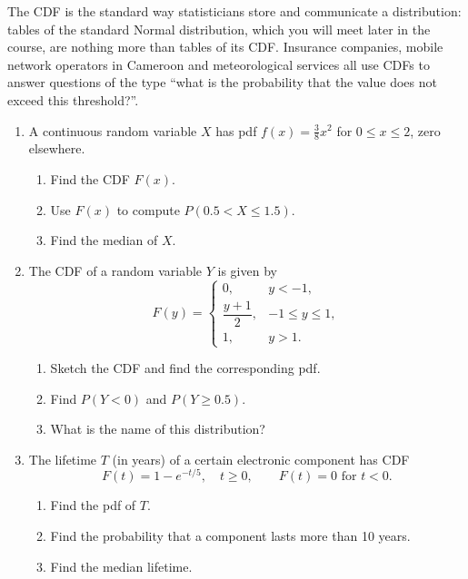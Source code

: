 \documentclass[11pt]{article}
\newcounter{popsec}
\newcounter{popsub}
\newcommand{\courssub}[1]{%
  \stepcounter{popsub}%
  \par\vspace{9pt}\noindent{\popxbold\fontsize{11.5}{13}\selectfont\color{popink}{\color{poporange}\thepopsec.\thepopsub}\hspace{6pt}#1}\par\nopagebreak\vspace{4pt}
}
\begin{document}
\begin{savaistu}
The CDF is the standard way statisticians store and communicate a distribution: tables of the standard Normal distribution, which you will meet later in the course, are nothing more than tables of its CDF. Insurance companies, mobile network operators in Cameroon and meteorological services all use CDFs to answer questions of the type ``what is the probability that the value does not exceed this threshold?''.
\end{savaistu}

\courssub{Exercises}

\begin{exercice}[Practice]
\begin{enumerate}
\item A continuous random variable $X$ has pdf $f(x) = \frac{3}{8}x^2$ for $0 \le x \le 2$, zero elsewhere.
\begin{enumerate}
\item Find the CDF $F(x)$.
\item Use $F(x)$ to compute $P(0.5 < X \le 1.5)$.
\item Find the median of $X$.
\end{enumerate}

\item The CDF of a random variable $Y$ is given by
\[
F(y) =
\begin{cases}
0, & y < -1,\\[4pt]
\dfrac{y+1}{2}, & -1 \le y \le 1,\\[8pt]
1, & y > 1.
\end{cases}
\]
\begin{enumerate}
\item Sketch the CDF and find the corresponding pdf.
\item Find $P(Y < 0)$ and $P(Y \ge 0.5)$.
\item What is the name of this distribution?
\end{enumerate}

\item The lifetime $T$ (in years) of a certain electronic component has CDF
\[
F(t) = 1 - e^{-t/5}, \quad t \ge 0, \qquad F(t)=0 \text{ for } t<0.
\]
\begin{enumerate}
\item Find the pdf of $T$.
\item Find the probability that a component lasts more than 10 years.
\item Find the median lifetime.
\end{enumerate}
\end{enumerate}
\end{exercice}
\end{document}
